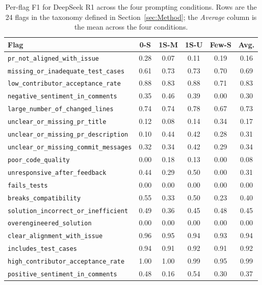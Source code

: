 \begin{table}[!htbp]
\centering
\caption{Per-flag F1 for DeepSeek R1 across the four prompting
conditions. Rows are the 24 flags in the taxonomy defined in
Section~\ref{sec:Method}; the \emph{Average} column is the mean across
the four conditions.}
\label{tab:perflag-deepseek-r1}
\small
\begin{tabular}{lccccc}
\toprule
Flag & 0-S & 1S-M & 1S-U & Few-S & Avg. \\
\midrule
\texttt{pr\_not\_aligned\_with\_issue} & 0.28 & 0.07 & 0.11 & 0.19 & 0.16 \\
\texttt{missing\_or\_inadequate\_test\_cases} & 0.61 & 0.73 & 0.73 & 0.70 & 0.69 \\
\texttt{low\_contributor\_acceptance\_rate} & 0.88 & 0.83 & 0.88 & 0.71 & 0.83 \\
\texttt{negative\_sentiment\_in\_comments} & 0.35 & 0.46 & 0.39 & 0.00 & 0.30 \\
\texttt{large\_number\_of\_changed\_lines} & 0.74 & 0.74 & 0.78 & 0.67 & 0.73 \\
\texttt{unclear\_or\_missing\_pr\_title} & 0.12 & 0.08 & 0.14 & 0.34 & 0.17 \\
\texttt{unclear\_or\_missing\_pr\_description} & 0.10 & 0.44 & 0.42 & 0.28 & 0.31 \\
\texttt{unclear\_or\_missing\_commit\_messages} & 0.32 & 0.34 & 0.42 & 0.29 & 0.34 \\
\texttt{poor\_code\_quality} & 0.00 & 0.18 & 0.13 & 0.00 & 0.08 \\
\texttt{unresponsive\_after\_feedback} & 0.44 & 0.29 & 0.50 & 0.00 & 0.31 \\
\texttt{fails\_tests} & 0.00 & 0.00 & 0.00 & 0.00 & 0.00 \\
\texttt{breaks\_compatibility} & 0.55 & 0.33 & 0.50 & 0.23 & 0.40 \\
\texttt{solution\_incorrect\_or\_inefficient} & 0.49 & 0.36 & 0.45 & 0.48 & 0.45 \\
\texttt{overengineered\_solution} & 0.00 & 0.00 & 0.00 & 0.00 & 0.00 \\
\texttt{clear\_alignment\_with\_issue} & 0.96 & 0.95 & 0.94 & 0.93 & 0.94 \\
\texttt{includes\_test\_cases} & 0.94 & 0.91 & 0.92 & 0.91 & 0.92 \\
\texttt{high\_contributor\_acceptance\_rate} & 1.00 & 1.00 & 0.99 & 0.95 & 0.99 \\
\texttt{positive\_sentiment\_in\_comments} & 0.48 & 0.16 & 0.54 & 0.30 & 0.37 \\

\end{tabular}
\end{table}
